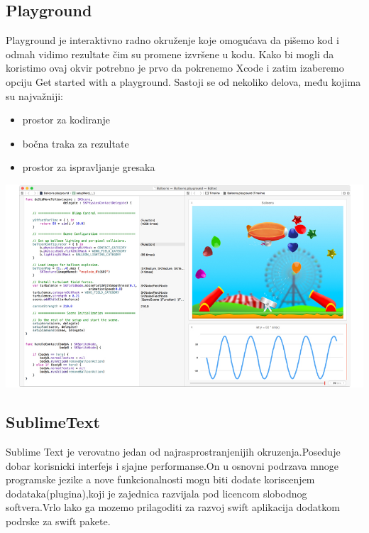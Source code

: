 \documentclass[a4paper]{article}
\begin{document}
\subsection{Playground}
\label{subsec:podnaslovPlayground}
\vspace{5mm}


Playground je interaktivno radno okruženje koje omogućava da pišemo kod i odmah vidimo
rezultate čim su promene izvršene u kodu. Kako bi mogli da koristimo ovaj okvir potrebno je prvo
da pokrenemo Xcode i zatim izaberemo opciju Get started with a playground.
Sastoji se od nekoliko delova, među kojima su najvažniji: 
\begin{itemize}
\item prostor za kodiranje
\item bočna traka za rezultate
\item prostor za ispravljanje gresaka
\end{itemize}
\vspace{5mm}


\includegraphics[scale=0.2]{playground.jpg}

\subsection{SublimeText}
\label{subsec:podnaslovSublimeText}

\vspace{5mm}




Sublime Text je verovatno jedan od najrasprostranjenijih okruzenja.Poseduje dobar korisnicki interfejs i sjajne performanse.On u osnovni podrzava mnoge programske jezike a nove funkcionalnosti mogu biti dodate koriscenjem dodataka(plugina),koji je zajednica razvijala pod licencom slobodnog softvera.Vrlo lako ga mozemo prilagoditi za razvoj swift aplikacija dodatkom podrske za swift pakete.
\vspace{5mm}
\end{document}
